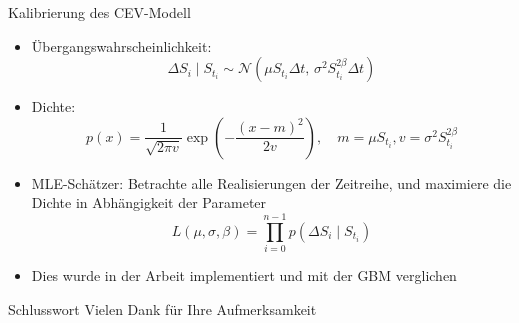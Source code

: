 \documentclass{beamer}
\begin{document}
\begin{frame}{Kalibrierung des CEV-Modell}
  \begin{itemize}
    \item Übergangswahrscheinlichkeit: $$\Delta S_i \mid S_{t_i} \sim \mathcal N\left(\mu S_{t_i} \Delta t,\, \sigma^2 S_{t_i}^{2\beta} \Delta t\right)$$
    \item Dichte: $$p(x) = \frac{1}{\sqrt{2\pi v}} \exp\left(-\frac{(x-m)^2}{2v}\right),\quad m = \mu S_{t_i}, v = \sigma^2 S_{t_i}^{2 \beta}$$
    \item MLE-Schätzer: Betrachte alle Realisierungen der Zeitreihe, und maximiere die Dichte in Abhängigkeit der Parameter
  $$L(\mu, \sigma, \beta) = \prod_{i=0}^{n-1} p(\Delta S_i \mid S_{t_i})$$
    \item Dies wurde in der Arbeit implementiert und mit der GBM verglichen
  \end{itemize}
\end{frame}

\begin{frame}{Schlusswort}
  \centering
  \Huge Vielen Dank für Ihre Aufmerksamkeit\\
\end{frame}
\end{document}
